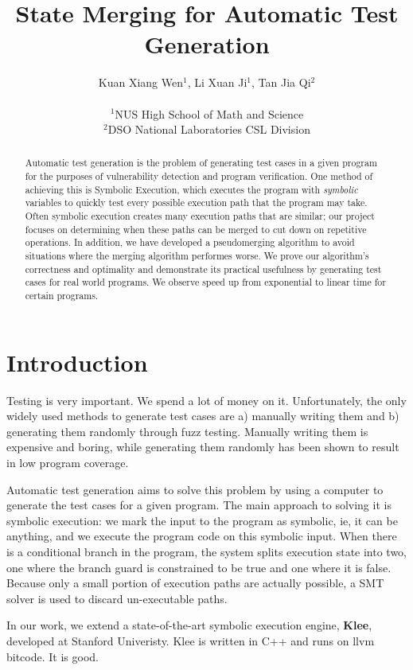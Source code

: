 \documentclass[12pt,a4paper]{article}
\title{State Merging for Automatic Test Generation}
\date{}
\author{
Kuan Xiang Wen$^{1}$, Li Xuan Ji$^{1}$, Tan Jia Qi$^{2}$\\
\vspace{1 mm} \\
\small{$^{1}$NUS High School of Math and Science}\\
\small{$^{2}$DSO National Laboratories CSL Division}
}
\begin{document}
\maketitle
\begin{abstract}
Automatic test generation is the problem of generating test cases in a given program for the purposes of vulnerability detection and program verification. One method of achieving this is Symbolic Execution, which executes the program with \emph{symbolic} variables to quickly test every possible execution path that the program may take. Often symbolic execution creates many execution paths that are similar; our project focuses on determining when these paths can be merged to cut down on repetitive operations. In addition, we have developed a pseudomerging algorithm to avoid situations where the merging algorithm performes worse. We prove our algorithm's correctness and optimality and demonstrate its practical usefulness by generating test cases for real world programs. We observe speed up from exponential to linear time for certain programs.
\end{abstract}

\section{Introduction}
Testing is very important. We spend a lot of money on it. Unfortunately, the only widely used methods to generate test cases are a) manually writing them and b) generating them randomly through fuzz testing. Manually writing them is expensive and boring, while generating them randomly has been shown to result in low program coverage. 

Automatic test generation aims to solve this problem by using a computer to generate the test cases for a given program. The main approach to solving it is symbolic execution: we mark the input to the program as symbolic, ie, it can be anything, and we execute the program code on this symbolic input. When there is a conditional branch in the program, the system splits execution state into two, one where the branch guard is constrained to be true and one where it is false. Because only a small portion of execution paths are actually possible, a SMT solver is used to discard un-executable paths. 

In our work, we extend a state-of-the-art symbolic execution engine, \textbf{Klee}, developed at Stanford Univeristy. Klee is written in C++ and runs on llvm bitcode. It is good.
\end{document}
